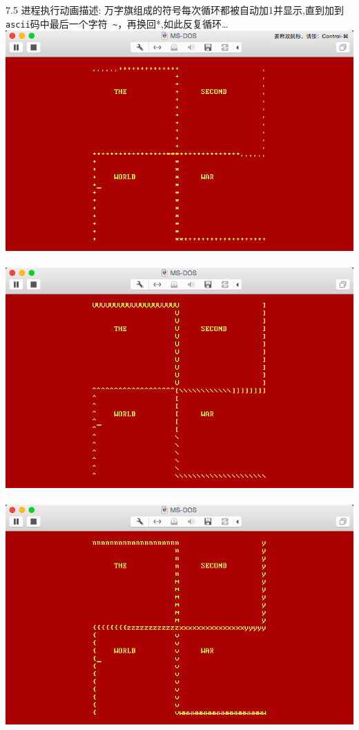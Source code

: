 \documentclass[a4paper]{article}
\begin{document}
{7.5 进程执行动画描述: 万字旗组成的符号每次循环都被自动加1并显示,直到加到\verb| ascii|码中最后一个字符\verb| ~|，再换回*,如此反复循环\ldots
{\center\includegraphics[scale=0.45]{Illustrations/process_1.png}}\\\\
{\center\includegraphics[scale=0.45]{Illustrations/process_2.png}}\\\\
{\center\includegraphics[scale=0.45]{Illustrations/process_3.png}}\\\\
}
\end{document}
